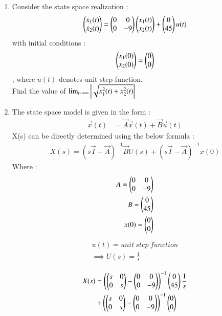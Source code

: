 \begin{enumerate}[label=\thesection.\arabic*.,ref=\thesection.\theenumi]

\item
Consider the state space realization : 
\begin{align}
    \begin{pmatrix}\dot x_{1}(t) \\ \dot x_{2}(t)\end{pmatrix}=\begin{pmatrix}0&0\\0&-9\end{pmatrix}\begin{pmatrix}x_{1}(t)\\x_{2}(t)\end{pmatrix} + \begin{pmatrix}0\\45\end{pmatrix}u(t)   
\end{align}
with initial conditions : 
\begin{align}
    \begin{pmatrix}x_{1}(0)\\x_{2}(0)\end{pmatrix} = \begin{pmatrix}0\\0\end{pmatrix}
\end{align}
, where $u(t)$ denotes unit step function.\\
 Find the value of $\lim _ {t \rightarrow \infty}\left\vert\sqrt{x_{1}^{2}(t) + x_{2}^{2}(t)}\right\vert$ 


\item 
\solution
The state space model is given in the form : 
\begin{align}
\dot{\vec{x}}(t)&=\vec{A}\vec{x}(t)+\vec{B}\vec{u}(t) 
\end{align}
 X(s) can be directly determined using the below formula  : 
\begin{align}
     X(s)={(s\vec{I}-\vec{A})^{-1}}\vec{B} U(s)+ (s\vec{I}-\vec{A})^{-1}x(0)
\end{align}
Where : 
\begin{align}
     A =    \begin{pmatrix}0&0\\0&-9\end{pmatrix}\\
     B =    \begin{pmatrix}0 \\ 45\end{pmatrix}\\
     x(0) = \begin{pmatrix}0\\0\end{pmatrix}
\end{align}
\begin{align}
    \begin{split}
         u(t) =   unit\ step\ function \\
         \implies U(s) = \frac{1}{s}
     \end{split}
\end{align}

\begin{align}
\begin{split}
     X(s) &= {\left(\begin{pmatrix}s&0\\0&s\end{pmatrix}-\begin{pmatrix}0&0\\0&-9\end{pmatrix} \right)^{-1}}\begin{pmatrix}0\\45\end{pmatrix}\frac{1}{s}\\
           & + \left(\begin{pmatrix}s&0\\0&s\end{pmatrix}-\begin{pmatrix}0&0\\0&-9\end{pmatrix} \right)^{-1}\begin{pmatrix}0\\0\end{pmatrix}
\end{split}
\end{align}


\end{enumerate}

